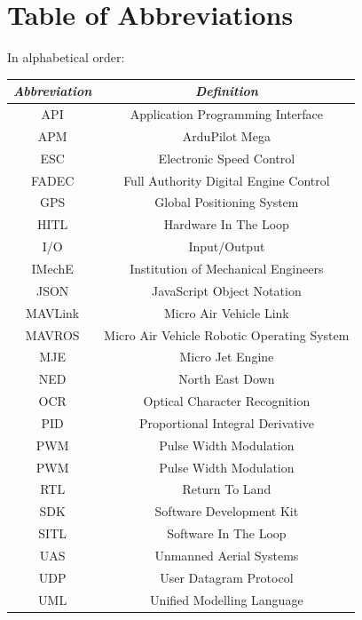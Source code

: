 \documentclass[11pt]{article}
\begin{document}
\section{Table of Abbreviations}
\begin{center}
    In alphabetical order:
    \begin{longtable}{|cc|}
        \hline
        \emph{Abbreviation} & \emph{Definition} \\
        \hline \endhead
        API & Application Programming Interface \\
        APM & ArduPilot Mega \\
        ESC & Electronic Speed Control \\
        FADEC & Full Authority Digital Engine Control \\
        GPS & Global Positioning System \\
        HITL & Hardware In The Loop \\
        I/O & Input/Output \\
        IMechE & Institution of Mechanical Engineers \\
        JSON & JavaScript Object Notation \\
        MAVLink & Micro Air Vehicle Link \\
        MAVROS & Micro Air Vehicle Robotic Operating System \\
        MJE & Micro Jet Engine \\
        NED & North East Down \\
        OCR & Optical Character Recognition \\
        PID & Proportional Integral Derivative \\
        PWM & Pulse Width Modulation \\
        PWM & Pulse Width Modulation \\
        RTL & Return To Land \\
        SDK & Software Development Kit \\
        SITL & Software In The Loop \\
        UAS & Unmanned Aerial Systems \\
        UDP & User Datagram Protocol \\
        UML & Unified Modelling Language \\
        \hline
    \end{longtable}
\end{center}
\end{document}
